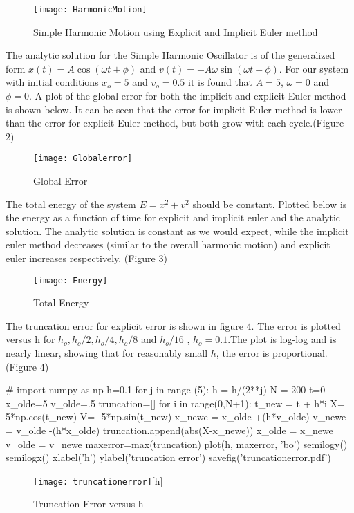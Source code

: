 \documentclass{article}
\begin{document}
\begin{figure}[h]
\texttt{[image: HarmonicMotion]}
\caption{Simple Harmonic Motion using Explicit and Implicit Euler method}
\end{figure}

The analytic solution for the Simple Harmonic Oscillator is of the generalized form $ x(t) = A \cos( \omega t + \phi)$ and $ v(t) = -A \omega \sin( \omega t + \phi)$. For our system with initial conditions $x_o = 5$ and $v_o = 0.5$ it is found that  $A=5$, $\omega = 0$ and $ \phi = 0$. A plot of the global error for both the implicit and explicit Euler method is shown below. 
It can be seen that the error for implicit Euler method is lower than the error for explicit Euler method, but both grow with each cycle.(Figure 2)
\begin{figure}[h]
\texttt{[image: Globalerror]}
\caption{Global Error}
\end{figure}
The total energy of the system $E = x^2 + v^2$ should be constant. Plotted below is the energy as a function of time for explicit and implicit euler and the analytic solution. The analytic solution is constant as we would expect, while the implicit euler method decreases (similar to the overall harmonic motion) and explicit euler increases respectively. (Figure 3)
\begin{figure}[h]
\texttt{[image: Energy]}
\caption{Total Energy}
\end{figure}

The truncation error for explicit error is shown in figure 4. The error is plotted versus h for $h_o, h_o/2, h_o/4, h_o/8$ and $ h_o/16$ , $h_o=0.1$.The plot is log-log and is nearly linear, showing that for reasonably small $h$, the error is proportional. (Figure 4)




\begin{pylabcode}[secondsession]
#
import numpy as np
h=0.1
for j in range (5):
	h = h/(2**j)
	N = 200
	t=0
	x_olde=5
	v_olde=.5
	truncation=[]
	for i in range(0,N+1): 
		t_new = t + h*i
		X= 5*np.cos(t_new)
		V= -5*np.sin(t_new)
		x_newe = x_olde +(h*v_olde)
		v_newe = v_olde -(h*x_olde)
		truncation.append(abs(X-x_newe))
       		x_olde = x_newe
       		v_olde = v_newe
	maxerror=max(truncation)
	plot(h, maxerror, 'bo')   
semilogy()
semilogx()
xlabel('h')
ylabel('truncation error')
savefig('truncationerror.pdf') 
\end{pylabcode}
\begin{figure}
\texttt{[image: truncationerror]}[h]
\caption{Truncation Error versus h}
\end{figure}
\end{document}
